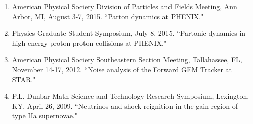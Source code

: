 \documentclass[11pt]{article}
\begin{document}
\begin{flushleft}
\begin{enumerate}
\item American Physical Society Division of Particles and Fields Meeting, Ann Arbor, MI, August 3-7, 2015. ``Parton dynamics at PHENIX." 

\item Physics Graduate Student Symposium, July 8, 2015.  ``Partonic dynamics in high energy proton-proton collisions at PHENIX." 

\item American Physical Society Southeastern Section Meeting, Tallahassee, FL, November 14-17, 2012.  ``Noise analysis of the Forward GEM Tracker at STAR." 

\item P.L. Dunbar Math Science and Technology Research Symposium, Lexington, KY, April 26, 2009. ``Neutrinos and shock reignition in the gain region of type IIa supernovae."
\end{enumerate}

\end{flushleft}

\vspace{7pt}










\vspace{7pt}
\end{document}
